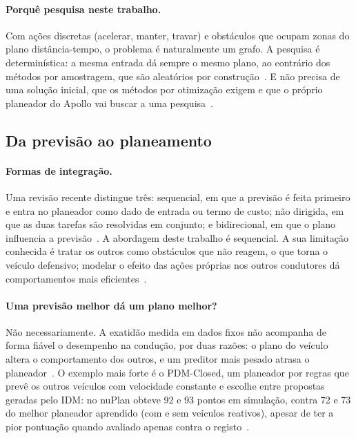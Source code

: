 \paragraph{Porquê pesquisa neste trabalho.}
Com ações discretas (acelerar, manter, travar) e obstáculos que ocupam
zonas do plano distância-tempo, o problema é naturalmente um grafo. A
pesquisa é determinística: a mesma entrada dá sempre o mesmo plano, ao
contrário dos métodos por amostragem, que são aleatórios por
construção~\cite{karaman2011sampling}. E não precisa de uma solução
inicial, que os métodos por otimização exigem e que o próprio planeador
do Apollo vai buscar a uma pesquisa~\cite{fan2018baidu}.

\subsection{Da previsão ao planeamento}
\label{sec:integracao}

\paragraph{Formas de integração.}
Uma revisão recente distingue três: sequencial, em que a previsão é feita
primeiro e entra no planeador como dado de entrada ou termo de custo; não
dirigida, em que as duas tarefas são resolvidas em conjunto; e
bidirecional, em que o plano influencia a
previsão~\cite{hagedorn2025integration}. A abordagem deste trabalho é
sequencial. A sua limitação conhecida é tratar os outros como obstáculos
que não reagem, o que torna o veículo defensivo; modelar o efeito das
ações próprias nos outros condutores dá comportamentos mais
eficientes~\cite{sadigh2016planning}.

\paragraph{Uma previsão melhor dá um plano melhor?}
Não necessariamente. A exatidão medida em dados fixos não acompanha de
forma fiável o desempenho na condução, por duas razões: o plano do veículo
altera o comportamento dos outros, e um preditor mais pesado atrasa o
planeador~\cite{tran2023what}. O exemplo
mais forte é o PDM-Closed, um planeador por regras que prevê os outros
veículos com velocidade constante e escolhe entre propostas geradas pelo
IDM: no nuPlan obteve 92 e 93 pontos em simulação, contra 72 e 73 do
melhor planeador aprendido (com e sem veículos reativos), apesar de ter
a pior pontuação quando avaliado apenas contra o
registo~\cite{dauner2023parting}.

